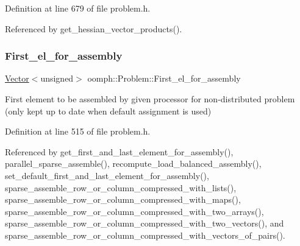 Definition at line 679 of file problem.\+h.



Referenced by get\+\_\+hessian\+\_\+vector\+\_\+products().

\mbox{\label{classoomph_1_1Problem_a0caac0918eaaea840238ce83f5be7836}} 
\subsubsection{\texorpdfstring{First\+\_\+el\+\_\+for\+\_\+assembly}{First\_el\_for\_assembly}}
{\footnotesize\ttfamily \hyperlink{classoomph_1_1Vector}{Vector}$<$unsigned$>$ oomph\+::\+Problem\+::\+First\+\_\+el\+\_\+for\+\_\+assembly\hspace{0.3cm}{\ttfamily [private]}}



First element to be assembled by given processor for non-\/distributed problem (only kept up to date when default assignment is used) 



Definition at line 515 of file problem.\+h.



Referenced by get\+\_\+first\+\_\+and\+\_\+last\+\_\+element\+\_\+for\+\_\+assembly(), parallel\+\_\+sparse\+\_\+assemble(), recompute\+\_\+load\+\_\+balanced\+\_\+assembly(), set\+\_\+default\+\_\+first\+\_\+and\+\_\+last\+\_\+element\+\_\+for\+\_\+assembly(), sparse\+\_\+assemble\+\_\+row\+\_\+or\+\_\+column\+\_\+compressed\+\_\+with\+\_\+lists(), sparse\+\_\+assemble\+\_\+row\+\_\+or\+\_\+column\+\_\+compressed\+\_\+with\+\_\+maps(), sparse\+\_\+assemble\+\_\+row\+\_\+or\+\_\+column\+\_\+compressed\+\_\+with\+\_\+two\+\_\+arrays(), sparse\+\_\+assemble\+\_\+row\+\_\+or\+\_\+column\+\_\+compressed\+\_\+with\+\_\+two\+\_\+vectors(), and sparse\+\_\+assemble\+\_\+row\+\_\+or\+\_\+column\+\_\+compressed\+\_\+with\+\_\+vectors\+\_\+of\+\_\+pairs().

\mbox{\label{classoomph_1_1Problem_a643f61299463a3bbf7be3f6a112aa130}} 
